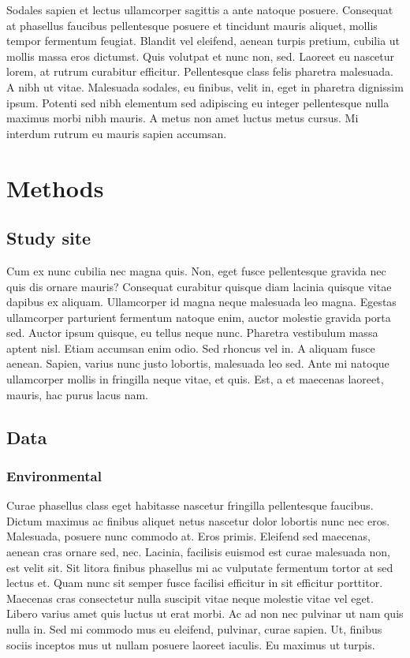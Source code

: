\documentclass[11pt,]{report}
\begin{document}
Sodales sapien et lectus ullamcorper sagittis a ante natoque posuere.
Consequat at phasellus faucibus pellentesque posuere et tincidunt mauris
aliquet, mollis tempor fermentum feugiat. Blandit vel eleifend, aenean
turpis pretium, cubilia ut mollis massa eros dictumst. Quis volutpat et
nunc non, sed. Laoreet eu nascetur lorem, at rutrum curabitur efficitur.
Pellentesque class felis pharetra malesuada. A nibh ut vitae. Malesuada
sodales, eu finibus, velit in, eget in pharetra dignissim ipsum. Potenti
sed nibh elementum sed adipiscing eu integer pellentesque nulla maximus
morbi nibh mauris. A metus non amet luctus metus cursus. Mi interdum
rutrum eu mauris sapien accumsan.

\hypertarget{methods}{%
\chapter{Methods}\label{methods}}

\hypertarget{study-site}{%
\section{Study site}\label{study-site}}

Cum ex nunc cubilia nec magna quis. Non, eget fusce pellentesque gravida
nec quis dis ornare mauris? Consequat curabitur quisque diam lacinia
quisque vitae dapibus ex aliquam. Ullamcorper id magna neque malesuada
leo magna. Egestas ullamcorper parturient fermentum natoque enim, auctor
molestie gravida porta sed. Auctor ipsum quisque, eu tellus neque nunc.
Pharetra vestibulum massa aptent nisl. Etiam accumsan enim odio. Sed
rhoncus vel in. A aliquam fusce aenean. Sapien, varius nunc justo
lobortis, malesuada leo sed. Ante mi natoque ullamcorper mollis in
fringilla neque vitae, et quis. Est, a et maecenas laoreet, mauris, hac
purus lacus nam.

\hypertarget{data}{%
\section{Data}\label{data}}

\hypertarget{environmental}{%
\subsection{Environmental}\label{environmental}}

Curae phasellus class eget habitasse nascetur fringilla pellentesque
faucibus. Dictum maximus ac finibus aliquet netus nascetur dolor
lobortis nunc nec eros. Malesuada, posuere nunc commodo at. Eros primis.
Eleifend sed maecenas, aenean cras ornare sed, nec. Lacinia, facilisis
euismod est curae malesuada non, est velit sit. Sit litora finibus
phasellus mi ac vulputate fermentum tortor at sed lectus et. Quam nunc
sit semper fusce facilisi efficitur in sit efficitur porttitor. Maecenas
cras consectetur nulla suscipit vitae neque molestie vitae vel eget.
Libero varius amet quis luctus ut erat morbi. Ac ad non nec pulvinar ut
nam quis nulla in. Sed mi commodo mus eu eleifend, pulvinar, curae
sapien. Ut, finibus sociis inceptos mus ut nullam posuere laoreet
iaculis. Eu maximus ut turpis.
\end{document}
